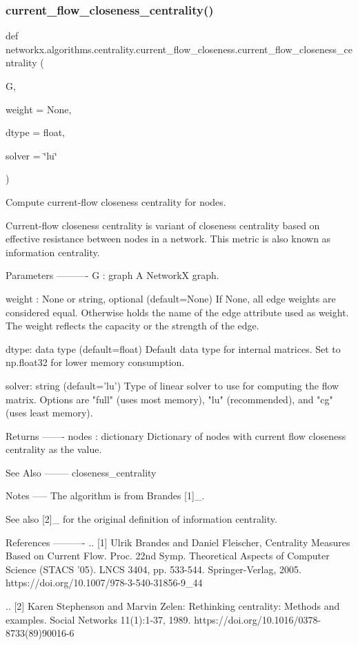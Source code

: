 \subsubsection{\texorpdfstring{current\+\_\+flow\+\_\+closeness\+\_\+centrality()}{current\_flow\_closeness\_centrality()}}
{\footnotesize\ttfamily def networkx.\+algorithms.\+centrality.\+current\+\_\+flow\+\_\+closeness.\+current\+\_\+flow\+\_\+closeness\+\_\+centrality (\begin{DoxyParamCaption}\item[{}]{G,  }\item[{}]{weight = {\ttfamily None},  }\item[{}]{dtype = {\ttfamily float},  }\item[{}]{solver = {\ttfamily \char`\"{}lu\char`\"{}} }\end{DoxyParamCaption})}

\begin{DoxyVerb}Compute current-flow closeness centrality for nodes.

Current-flow closeness centrality is variant of closeness
centrality based on effective resistance between nodes in
a network. This metric is also known as information centrality.

Parameters
----------
G : graph
  A NetworkX graph.

weight : None or string, optional (default=None)
  If None, all edge weights are considered equal.
  Otherwise holds the name of the edge attribute used as weight.
  The weight reflects the capacity or the strength of the
  edge.

dtype: data type (default=float)
  Default data type for internal matrices.
  Set to np.float32 for lower memory consumption.

solver: string (default='lu')
   Type of linear solver to use for computing the flow matrix.
   Options are "full" (uses most memory), "lu" (recommended), and
   "cg" (uses least memory).

Returns
-------
nodes : dictionary
   Dictionary of nodes with current flow closeness centrality as the value.

See Also
--------
closeness_centrality

Notes
-----
The algorithm is from Brandes [1]_.

See also [2]_ for the original definition of information centrality.

References
----------
.. [1] Ulrik Brandes and Daniel Fleischer,
   Centrality Measures Based on Current Flow.
   Proc. 22nd Symp. Theoretical Aspects of Computer Science (STACS '05).
   LNCS 3404, pp. 533-544. Springer-Verlag, 2005.
   https://doi.org/10.1007/978-3-540-31856-9_44

.. [2] Karen Stephenson and Marvin Zelen:
   Rethinking centrality: Methods and examples.
   Social Networks 11(1):1-37, 1989.
   https://doi.org/10.1016/0378-8733(89)90016-6
\end{DoxyVerb}
 

